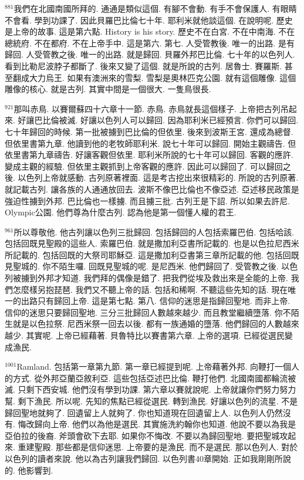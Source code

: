 \documentclass{book}
\begin{document}
$^{881}$我們在北國南國所拜的.
通通是類似這個.
有腳不會動.
有手不會保護人.
有眼睛不會看.
學到功課了.
因此貝羅巴比倫七十年.
耶利米就他談這個.
在說明呢.
歷史是上帝的故事.
這是第六點.
History is his story.
歷史不在白宮.
不在中南海.
不在總統府.
不在都府.
不在上帝手中.
這是第六.
第七.
人受管教後.
唯一的出路.
是有歸回.
人受管教之後.
唯一的出路.
就是歸回.
貝羅外邦巴比倫.
七十年的以色列人.
看到比勒尼波脖子都斷了.
後來又變了這個.
就是所說的古列.
居魯士.
賽羅斯.
甚至翻成大力烏王.
如果有澳洲來的雪梨.
雪梨是奧林匹克公園.
就有這個雕像.
這個雕像的核心.
就是古列.
其實中間是一個很大.
一隻鳥很長.

$^{921}$那叫赤鳥.
以賽爾蘇四十六章十一節.
赤鳥.
赤鳥就長這個樣子.
上帝把古列吊起來.
好讓巴比倫被滅.
好讓以色列人可以歸回.
因為耶利米已經預言.
你們可以歸回.
七十年歸回的時候.
第一批被擄到巴比倫的但依里.
後來到波斯王宮.
還成為總督.
但依里書第九章.
他讀到他的老牧師耶利米.
說七十年可以歸回.
開始主觀禱告.
但依里書第九章禱告.
好讓客觀但依里.
耶利米所說的七十年可以歸回.
客觀的應許.
變成主觀的經驗.
但依里主觀抓到上帝客觀的應許.
因此可以歸回了.
可以歸回之後.
以色列上帝就感動.
古列原著裡面.
這是考古挖出來很精彩的.
所說的古列原著.
就記載古列.
讓各族的人通通放回去.
波斯不像巴比倫也不像亞述.
亞述移民政策是強迫性擄到外邦.
巴比倫也一樣擄.
而且擄三批.
古列王是下詔.
所以如果去許尼.
Olympic公園.
他們尊為什麼古列.
認為他是第一個懂人權的君王.

$^{961}$所以尊敬他.
他古列讓以色列三批歸回.
包括歸回的人包括索羅巴伯.
包括哈該.
包括回既見聖殿的這些人.
索羅巴伯.
就是撒加利亞書所記載的.
也是以色拉尼西米所記載的.
包括回既的大祭司耶穌亞.
這是撒加利亞書第三章所記載的他.
包括回既見聖城的.
你不陌生囉.
回既見聖城的呢.
是尼西米.
他們歸回了.
受管教之後.
以色列被擄到外邦才知道.
我們拜的偶像是錯了.
把我們從埃及救出來是全能的上帝.
我們怎麼樣另抱琵琶.
我們又不聽上帝的話.
包括和稀啊.
不聽這些先知的話.
現在唯一的出路只有歸回上帝.
這是第七點.
第八.
信仰的迷思是指歸回聖地.
而非上帝.
信仰的迷思只要歸回聖地.
三分三批歸回人數越來越少.
而且教堂繼續墮落.
你不陌生就是以色拉祭.
尼西米祭一回去以後.
都有一族通婚的墮落.
他們歸回的人數越來越少.
其實呢.
上帝已經藉著.
貝魯特比以賽書第六章.
上帝的選項.
已經從選民變成漁民.

$^{1001}$Ramland.
包括第一章第九節.
第一章已經提到呢.
上帝藉著外邦.
向鞭打一個人的方式.
從外邦亞蘭亞敘利亞.
這些包括亞述巴比倫.
鞭打他們.
北國南國都輪流被滅.
只剩下西安城.
他們沒有學到功課.
第六章以賽就說呢.
上帝就讓你們努力努力幫.
剩下漁民.
所以呢.
先知的焦點已經從選民.
轉到漁民.
好讓以色列的流星.
不是歸回聖地就夠了.
回遺留上人就夠了.
你也知道現在回遺留上人.
以色列人仍然沒有.
悔改歸向上帝.
他們以為他是選民.
其實施洗約翰你也知道.
他說不要以為我是亞伯拉的後裔.
斧頭會砍下去耶.
如果你不悔改.
不要以為歸回聖地.
要把聖城攻起來.
重建聖殿.
那些都是信仰迷思.
上帝要的是漁民.
而不是選民.
那以色列人.
對於以色列的讀者來說.
他以為古列讓我們歸回.
以色列書40章開始.
正如我剛剛所說的.
他影響到.
\end{document}

